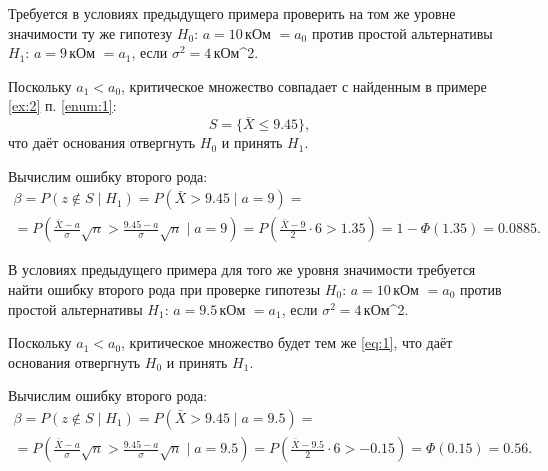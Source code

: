 \begin{ex}
	Требуется в условиях предыдущего примера проверить на том же уровне значимости
	ту же гипотезу $ H_0 $: $ a = 10 $\,кОм $ = a_0 $ против простой альтернативы
	$ H_1 $: $ a = 9 $\,кОм $ = a_1 $, если $ \sigma^2 = 4 $\,кОм^2. 
	\begin{solution}
		Поскольку $ a_1 < a_0 $, критическое множество совпадает с найденным в
		примере \ref{ex:2} п. \ref{enum:1}:  
		\begin{equation}\label{eq:1}
			S = \{\bar X \leqslant 9.45\},
		\end{equation}
		что даёт основания отвергнуть $ H_0 $ и принять $ H_1 $. 

		Вычислим ошибку	второго рода: 
		\begin{multline*}
				\beta = P(z \notin S \mid H_1) = P(\bar X > 9.45 \mid a = 9) =\\= P \left(
				\frac{\bar X - a}{\sigma}\sqrt n > \frac{9.45 - a}{\sigma}\sqrt n \mid a
			= 9\right) = P \left( \frac{\bar X - 9}{2} \cdot 6 > 1.35 \right) = 1 -
			\Phi(1.35) = 0.0885.
		\end{multline*}

	\end{solution}
\end{ex}
\begin{ex}
	В условиях предыдущего примера для того же уровня значимости требуется найти
	ошибку второго рода при проверке гипотезы $ H_0 $: $ a =10 $\,кОм $ = a_0 $
	против простой альтернативы $ H_1 $: $ a = 9.5 $\,кОм $ = a_1 $, если $
	\sigma^2 = 4 $\,кОм^2.
	\begin{solution}
		Поскольку $ a_1 < a_0 $, критическое множество будет тем же \eqref{eq:1},
		что даёт основания отвергнуть $ H_0 $ и принять $ H_1 $.

		Вычислим ошибку второго рода: 
		\begin{multline*}
				\beta = P(z\notin S\mid H_1) = P(\bar X > 9.45 \mid a = 9.5) =\\=
				P \left(
				\frac{\bar X - a}{\sigma}\sqrt n> \frac{9.45 - a}{\sigma} \sqrt n\mid a
			= 9.5\right) = P \left( \frac{\bar X - 9.5}{2}\cdot 6 > -0.15 \right) =
			\Phi(0.15) = 0.56.
		\end{multline*}
	\end{solution}	
\end{ex}
